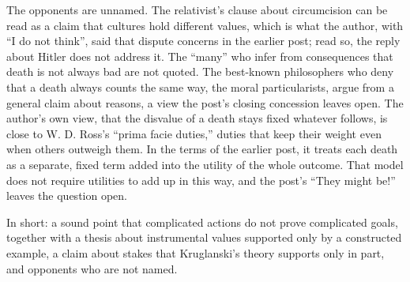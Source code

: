 \begin{afterword}
The opponents are unnamed. The relativist's clause about circumcision can be read as a claim that cultures hold different values, which is what the author, with ``I do not think'', said that dispute concerns in the earlier post; read so, the reply about Hitler does not address it. The ``many'' who infer from consequences that death is not always bad are not quoted. The best-known philosophers who deny that a death always counts the same way, the moral particularists, argue from a general claim about reasons, a view the post's closing concession leaves open. The author's own view, that the disvalue of a death stays fixed whatever follows, is close to W. D. Ross's ``prima facie duties,'' duties that keep their weight even when others outweigh them. In the terms of the earlier post, it treats each death as a separate, fixed term added into the utility of the whole outcome. That model does not require utilities to add up in this way, and the post's ``They might be!'' leaves the question open.

In short: a sound point that complicated actions do not prove complicated goals, together with a thesis about instrumental values supported only by a constructed example, a claim about stakes that Kruglanski's theory supports only in part, and opponents who are not named.
\end{afterword}
